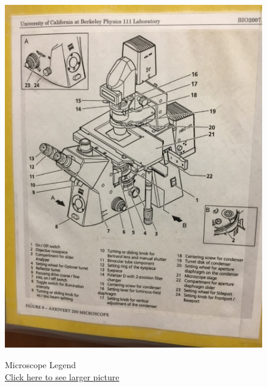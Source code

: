 \documentclass{../lab}
\begin{document}
\begin{figure}[H]
  \href{http://experimentationlab.berkeley.edu/sites/default/files/upimages/2_Legend-Microscope_2540.JPG}{\includegraphics[width=\linewidth,keepaspectratio]{images/2_Legend-Microscope_2540.JPG}}
  \caption{Microscope Legend \\
  \href{http://experimentationlab.berkeley.edu/sites/default/files/upimages/2_Legend-Microscope_2540.JPG}{Click here to see larger picture}}
  \label{fig:MicroscopeLegend}
\endminipage \hfill
{}

\end{figure}
\end{document}
